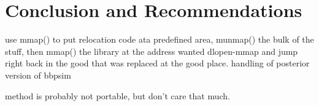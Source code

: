 \chapter{Conclusion and Recommendations}\label{cha:conclusion}
use mmap() to put relocation code ata predefined area, munmap() the bulk of the stuff, then mmap() the library at the address wanted dlopen-mmap and jump right back in the good that was replaced at the good place. handling of posterior version of bbpsim

method is probably not portable, but don't care that much.